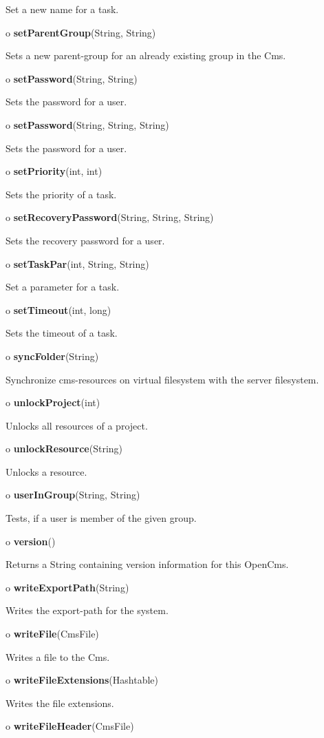 \begin{description}
Set a new name for a task.  
\item o {\bf setParentGroup}(String, String)  

Sets a new parent-group for an already existing group in the Cms.  
\item o {\bf setPassword}(String, String)  

Sets the password for a user.  
\item o {\bf setPassword}(String, String, String)  

Sets the password for a user.  
\item o {\bf setPriority}(int, int)  

Sets the priority of a task.  
\item o {\bf setRecoveryPassword}(String, String, String)  

Sets the recovery password for a user.  
\item o {\bf setTaskPar}(int, String, String)  

Set a parameter for a task.  
\item o {\bf setTimeout}(int, long)  

Sets the timeout of a task.  
\item o {\bf syncFolder}(String)  

Synchronize cms-resources on virtual filesystem with the server filesystem.  
\item o {\bf unlockProject}(int)  

Unlocks all resources of a project.  
\item o {\bf unlockResource}(String)  

Unlocks a resource.  
\item o {\bf userInGroup}(String, String)  

Tests, if a user is member of the given group.  
\item o {\bf version}()  

Returns a String containing version information for this OpenCms.  
\item o {\bf writeExportPath}(String)  

Writes the export-path for the system.  
\item o {\bf writeFile}(CmsFile)  

Writes a file to the Cms.  
\item o {\bf writeFileExtensions}(Hashtable)  

Writes the file extensions.  
\item o {\bf writeFileHeader}(CmsFile)  


\end{description}

